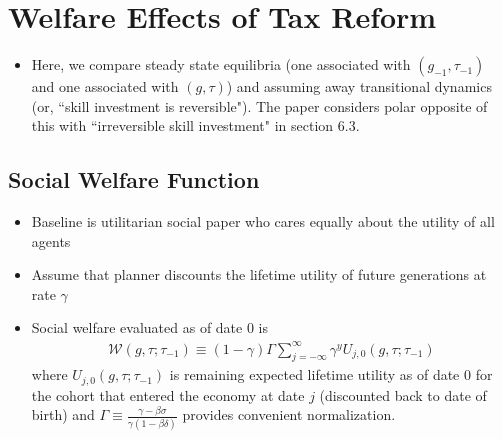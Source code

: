 \documentclass{article}
\begin{document}
\pagebreak

\section{Welfare Effects of Tax Reform}

\begin{itemize}
\item Here, we compare steady state equilibria (one associated with $(g_{-1}, \tau_{-1})$ and one associated with $(g, \tau)$) and assuming away transitional dynamics (or, ``skill investment is reversible"). The paper considers polar opposite of this with ``irreversible skill investment" in section 6.3.
\end{itemize}

\subsection{Social Welfare Function}

\begin{itemize}
\item Baseline is utilitarian social paper who cares equally about the utility of all agents
\item Assume that planner discounts the lifetime utility of future generations at rate $\gamma$
\item Social welfare evaluated as of date 0 is
\begin{align}
\mathcal{W}(g, \tau; \tau_{-1}) \equiv (1-\gamma) \Gamma \sum_{j = -\infty}^\infty \gamma^y U_{j,0} (g, \tau; \tau_{-1}) \label{swf}
\end{align}
where $U_{j,0} (g, \tau; \tau_{-1})$ is remaining expected lifetime utility as of date 0 for the cohort that entered the economy at date $j$ (discounted back to date of birth) and $\Gamma \equiv \frac{\gamma - \beta \sigma}{\gamma(1-\beta\delta)}$ provides convenient normalization.
\end{itemize}
\end{document}
